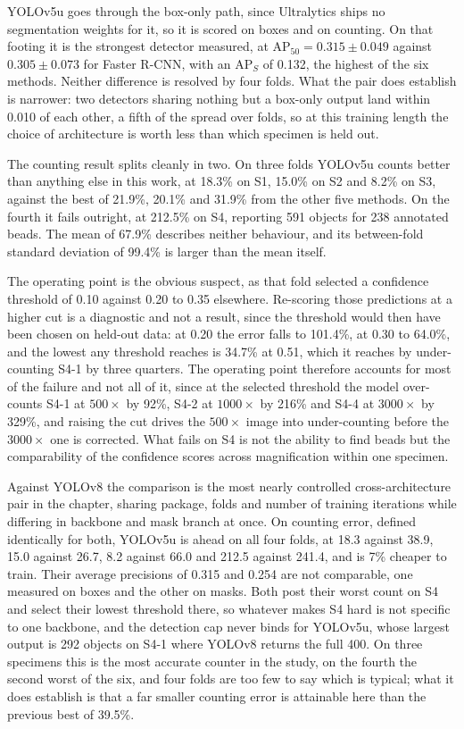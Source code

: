 YOLOv5u goes through the box-only path, since Ultralytics ships no segmentation
weights for it, so it is scored on boxes and on counting. On that footing it is
the strongest detector measured, at $\mathrm{AP}_{50} = 0.315 \pm 0.049$ against
$0.305 \pm 0.073$ for Faster R-CNN, with an $\mathrm{AP}_S$ of 0.132, the highest
of the six methods. Neither difference is resolved by four folds. What the pair
does establish is narrower: two detectors sharing nothing but a box-only output
land within 0.010 of each other, a fifth of the spread over folds, so at this
training length the choice of architecture is worth less than which specimen is held out.

The counting result splits cleanly in two. On three folds YOLOv5u counts better
than anything else in this work, at 18.3\% on S1, 15.0\% on S2 and 8.2\% on S3,
against the best of 21.9\%, 20.1\% and 31.9\% from the other five methods. On the
fourth it fails outright, at 212.5\% on S4, reporting 591 objects for 238
annotated beads. The mean of 67.9\% describes neither behaviour, and its
between-fold standard deviation of 99.4\% is larger than the mean itself.

The operating point is the obvious suspect, as that fold selected a confidence
threshold of 0.10 against 0.20 to 0.35 elsewhere. Re-scoring those predictions at
a higher cut is a diagnostic and not a result, since the threshold would then have
been chosen on held-out data: at 0.20 the error falls to 101.4\%, at 0.30 to
64.0\%, and the lowest any threshold reaches is 34.7\% at 0.51, which it reaches
by under-counting S4-1 by three quarters. The operating point therefore accounts
for most of the failure and not all of it, since at the selected threshold the
model over-counts S4-1 at $500\times$ by 92\%, S4-2 at $1000\times$ by 216\% and
S4-4 at $3000\times$ by 329\%, and raising the cut drives the $500\times$
image into under-counting before the $3000\times$ one is corrected. What
fails on S4 is not the ability to find beads but the comparability of the
confidence scores across magnification within one specimen.

Against YOLOv8 the comparison is the most nearly controlled cross-architecture
pair in the chapter, sharing package, folds and number of training iterations while differing in
backbone and mask branch at once. On counting error, defined identically for both,
YOLOv5u is ahead on all four folds, at 18.3 against 38.9, 15.0 against 26.7, 8.2
against 66.0 and 212.5 against 241.4, and is 7\% cheaper to train. Their average
precisions of 0.315 and 0.254 are not comparable, one measured on boxes and the
other on masks. Both post their worst count on S4 and select their lowest
threshold there, so whatever makes S4 hard is not specific to one backbone, and
the detection cap never binds for YOLOv5u, whose largest output is 292 objects on
S4-1 where YOLOv8 returns the full 400. On three specimens this is the most
accurate counter in the study, on the fourth the second worst of the six, and four
folds are too few to say which is typical; what it does establish is that a far
smaller counting error is attainable here than the previous best of 39.5\%.

